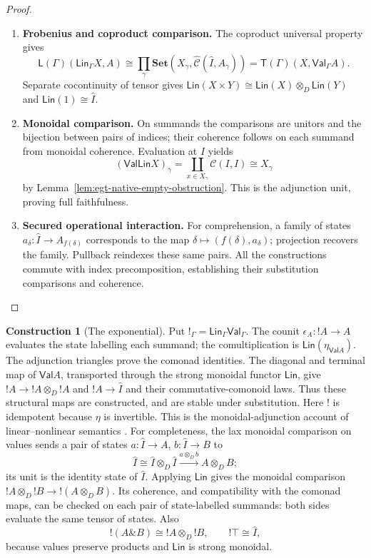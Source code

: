 \documentclass[11pt,a4paper]{article}
\numberwithin{equation}{section}
\theoremstyle{definition}
\newtheorem{construction}[construction]{Construction}
\theoremstyle{remark}
\theoremstyle{plain}
\begin{document}
\begin{proof}
\leavevmode
\begin{enumerate}[label=\textup{(\arabic*)},leftmargin=*,itemsep=4pt,topsep=3pt]
  \item \textbf{Frobenius and coproduct comparison.} The coproduct universal property gives
\[
 \mathsf L(\Gamma)(\mathsf{Lin}_\Gamma X,A)
 \cong\prod_\gamma\mathbf{Set}
              (X_\gamma,\widehat{\mathcal C}(\widehat I,A_\gamma))
 =\mathsf T(\Gamma)(X,\mathsf{Val}_\Gamma A).
\]
Separate cocontinuity of tensor gives
$\mathsf{Lin}(X\times Y)\cong\mathsf{Lin}(X)\otimes_D\mathsf{Lin}(Y)$
and $\mathsf{Lin}(1)\cong \widehat I$.
  \item \textbf{Monoidal comparison.} On summands the comparisons are unitors
and the bijection between pairs of indices; their coherence follows on
each summand from monoidal coherence. Evaluation at $I$ yields
\[
 (\mathsf{Val}\mathsf{Lin}X)_\gamma
 =\coprod_{x\in X_\gamma}\mathcal C(I,I)\cong X_\gamma
\]
by Lemma~\ref{lem:egt-native-empty-obstruction}. This is the adjunction
unit, proving full faithfulness.
  \item \textbf{Secured operational interaction.} For comprehension, a family of states
$a_\delta:\widehat I\to A_{f(\delta)}$ corresponds to the map
$\delta\mapsto(f(\delta),a_\delta)$; projection recovers the family. Pullback reindexes these same pairs. All the constructions commute with
index precomposition, establishing their substitution comparisons and
coherence.
\end{enumerate}
\end{proof}


\begin{construction}[The exponential]
\label{con:egt-exponential}
Put $!_\Gamma=\mathsf{Lin}_\Gamma\mathsf{Val}_\Gamma$. The counit
$\epsilon_A:!A\to A$ evaluates the state labelling each summand; the
comultiplication is $\mathsf{Lin}(\eta_{\mathsf{Val}A})$.
The adjunction triangles prove the comonad identities. The diagonal and
terminal map of $\mathsf{Val}A$, transported through the strong monoidal
functor $\mathsf{Lin}$, give
$!A\to !A\otimes_D !A$ and $!A\to \widehat I$ and their commutative-comonoid laws.
Thus these structural maps are constructed, and are stable under
substitution. Here $!$ is idempotent because $\eta$ is invertible.
This is the monoidal-adjunction account of linear--nonlinear
semantics \citep{Benton1994MixedLNL}.
For completeness, the lax monoidal comparison on values sends a pair
of states $a:\widehat I\to A$, $b:\widehat I\to B$ to
\[
 \widehat I\cong\widehat I\otimes_D\widehat I
       \xrightarrow{a\otimes_D b}A\otimes_D B;
\]
its unit is the identity state of $\widehat I$. Applying
$\mathsf{Lin}$ gives the monoidal comparison
$!A\otimes_D!B\to!(A\otimes_D B)$. Its coherence, and compatibility
with the comonad maps, can be checked on each pair of state-labelled
summands: both sides evaluate the same tensor of states. Also
\[
 !(A\mathbin{\&}B)\cong!A\otimes_D!B,
 \qquad !\top\cong\widehat I,
\]
because values preserve products and $\mathsf{Lin}$ is strong monoidal.
\end{construction}
\end{document}
